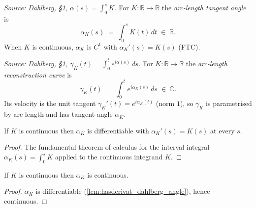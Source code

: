\begin{definition}


  \label{def:dahlberg_angle}
  \textit{Source: Dahlberg, §1, $\alpha(s)=\int_0^s K$.}
  For $K : \mathbb{R}\to\mathbb{R}$ the \emph{arc-length tangent angle} is
  \[
    \alpha_K(s) \;=\; \int_0^s K(t)\,dt \;\in\; \mathbb{R}.
  \]
  When $K$ is continuous, $\alpha_K$ is $C^1$ with $\alpha_K'(s)=K(s)$ (FTC).
\end{definition}

\begin{definition}


  \label{def:dahlberg_curve}
  \textit{Source: Dahlberg, §1, $\gamma_K(t)=\int_0^t e^{i\alpha(s)}\,ds$.}
  For $K : \mathbb{R}\to\mathbb{R}$ the \emph{arc-length reconstruction curve} is
  \[
    \gamma_K(t) \;=\; \int_0^t e^{i\alpha_K(s)}\,ds \;\in\; \mathbb{C}.
  \]
  Its velocity is the unit tangent $\gamma_K'(t)=e^{i\alpha_K(t)}$ (norm $1$), so
  $\gamma_K$ is parametrised by arc length and has tangent angle $\alpha_K$.
\end{definition}

\begin{lemma}


  \label{lem:hasderivat_dahlberg_angle}
  If $K$ is continuous then $\alpha_K$ is differentiable with
  $\alpha_K'(s)=K(s)$ at every $s$.
\end{lemma}
\begin{proof}
  \leanok
  The fundamental theorem of calculus for the interval integral
  $\alpha_K(s)=\int_0^s K$ applied to the continuous integrand $K$.
\end{proof}

\begin{lemma}


  \label{lem:continuous_dahlberg_angle}
  If $K$ is continuous then $\alpha_K$ is continuous.
\end{lemma}
\begin{proof}
  \leanok
  $\alpha_K$ is differentiable (\cref{lem:hasderivat_dahlberg_angle}), hence
  continuous.
\end{proof}

